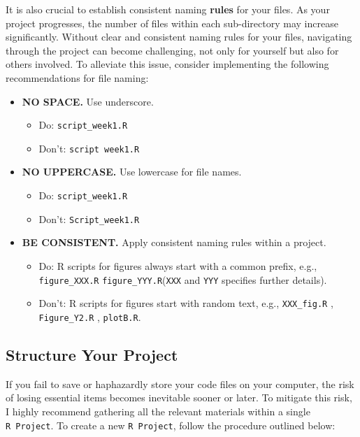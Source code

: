 \documentclass[
]{book}
\providecommand{\tightlist}{%
  \setlength{\itemsep}{0pt}\setlength{\parskip}{0pt}}
\begin{document}
It is also crucial to establish consistent naming \textbf{rules} for your files. As your project progresses, the number of files within each sub-directory may increase significantly. Without clear and consistent naming rules for your files, navigating through the project can become challenging, not only for yourself but also for others involved. To alleviate this issue, consider implementing the following recommendations for file naming:

\begin{itemize}
\tightlist
\item
  \textbf{NO SPACE.} Use underscore.

  \begin{itemize}
  \tightlist
  \item
    Do: \texttt{script\_week1.R}
  \item
    Don't: \texttt{script\ week1.R}
  \end{itemize}
\item
  \textbf{NO UPPERCASE.} Use lowercase for file names.

  \begin{itemize}
  \tightlist
  \item
    Do: \texttt{script\_week1.R}
  \item
    Don't: \texttt{Script\_week1.R}
  \end{itemize}
\item
  \textbf{BE CONSISTENT.} Apply consistent naming rules within a project.

  \begin{itemize}
  \tightlist
  \item
    Do: R scripts for figures always start with a common prefix, e.g., \texttt{figure\_XXX.R} \texttt{figure\_YYY.R}(\texttt{XXX} and \texttt{YYY} specifies further details).
  \item
    Don't: R scripts for figures start with random text, e.g., \texttt{XXX\_fig.R} , \texttt{Figure\_Y2.R} , \texttt{plotB.R}.
  \end{itemize}
\end{itemize}

\hypertarget{structure-your-project}{%
\subsection{Structure Your Project}\label{structure-your-project}}

If you fail to save or haphazardly store your code files on your computer, the risk of losing essential items becomes inevitable sooner or later. To mitigate this risk, I highly recommend gathering all the relevant materials within a single \texttt{R\ Project}. To create a new \texttt{R\ Project}, follow the procedure outlined below:
\end{document}
